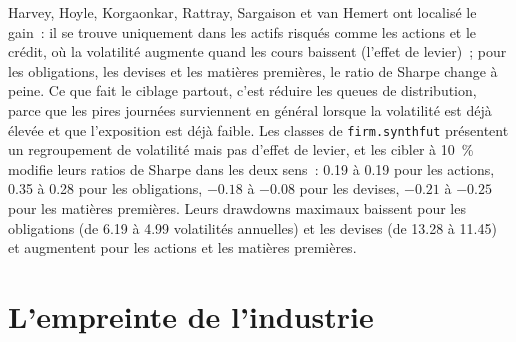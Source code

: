 \begin{omfigure}

\label{fig:s1:volatility-targeting-and-risk-managed-portfolios:seeds}
\end{omfigure}

Harvey, Hoyle, Korgaonkar, Rattray, Sargaison et van Hemert ont localisé le gain~: il se trouve uniquement dans les actifs risqués comme les actions et le crédit, où
la volatilité augmente quand les cours baissent (l'effet de levier)~; pour les obligations, les devises et les matières premières, le ratio de Sharpe change à peine. Ce que fait le ciblage
partout, c'est réduire les queues de distribution, parce que les pires journées surviennent en général lorsque la volatilité est déjà élevée et que l'exposition est déjà faible.
Les classes de \texttt{firm.synthfut} présentent un regroupement de volatilité mais pas d'effet de levier, et les cibler à 10~\% modifie leurs ratios de Sharpe dans les deux sens~:
0.19 à 0.19 pour les actions, 0.35 à 0.28 pour les obligations, $-0.18$ à $-0.08$ pour les devises, $-0.21$ à $-0.25$ pour les matières premières. Leurs
drawdowns maximaux baissent pour les obligations (de 6.19 à 4.99 volatilités annuelles) et les devises (de 13.28 à 11.45) et augmentent pour les actions et les matières premières.

\section{L'empreinte de l'industrie}

